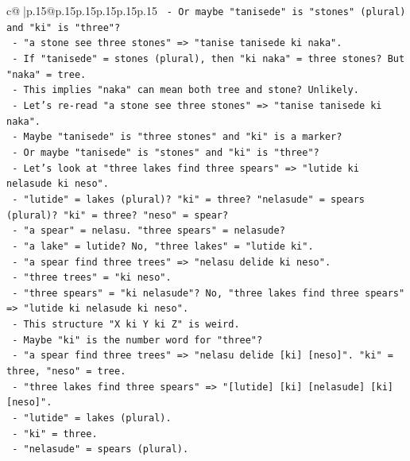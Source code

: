 \documentclass{article}
\begin{document}
{\begin{supertabular}{c@{$\;$}|p{.15\linewidth}@{}p{.15\linewidth}p{.15\linewidth}p{.15\linewidth}p{.15\linewidth}p{.15\linewidth}}
{{{\texttt{           {-} Or maybe "tanisede" is "stones" (plural) and "ki" is "three"?} \\
\texttt{           {-} "a stone see three stones" => "tanise tanisede ki naka".} \\
\texttt{           {-} If "tanisede" = stones (plural), then "ki naka" = three stones? But "naka" = tree.} \\
\texttt{           {-} This implies "naka" can mean both tree and stone? Unlikely.} \\
\texttt{           {-} Let's re{-}read "a stone see three stones" => "tanise tanisede ki naka".} \\
\texttt{           {-} Maybe "tanisede" is "three stones" and "ki" is a marker?} \\
\texttt{           {-} Or maybe "tanisede" is "stones" and "ki" is "three"?} \\
\texttt{           {-} Let's look at "three lakes find three spears" => "lutide ki nelasude ki neso".} \\
\texttt{             {-} "lutide" = lakes (plural)? "ki" = three? "nelasude" = spears (plural)? "ki" = three? "neso" = spear?} \\
\texttt{             {-} "a spear" = nelasu. "three spears" = nelasude?} \\
\texttt{             {-} "a lake" = lutide? No, "three lakes" = "lutide ki".} \\
\texttt{             {-} "a spear find three trees" => "nelasu delide ki neso".} \\
\texttt{             {-} "three trees" = "ki neso".} \\
\texttt{             {-} "three spears" = "ki nelasude"? No, "three lakes find three spears" => "lutide ki nelasude ki neso".} \\
\texttt{             {-} This structure "X ki Y ki Z" is weird.} \\
\texttt{             {-} Maybe "ki" is the number word for "three"?} \\
\texttt{             {-} "a spear find three trees" => "nelasu delide {[}ki{]} {[}neso{]}". "ki" = three, "neso" = tree.} \\
\texttt{             {-} "three lakes find three spears" => "{[}lutide{]} {[}ki{]} {[}nelasude{]} {[}ki{]} {[}neso{]}".} \\
\texttt{               {-} "lutide" = lakes (plural).} \\
\texttt{               {-} "ki" = three.} \\
\texttt{               {-} "nelasude" = spears (plural).} \\
}}}
\end{supertabular}}
\end{document}
